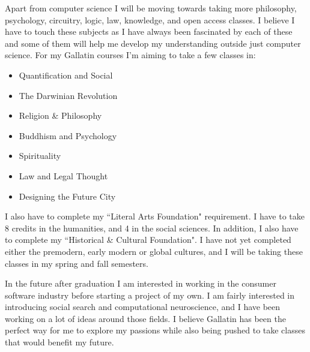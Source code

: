 \documentclass[11pt, oneside]{article}
\begin{document}
\par Apart from computer science I will be moving towards taking more philosophy, psychology, circuitry, logic, law, knowledge, and open access classes. I believe I have to touch these subjects as I have always been fascinated by each of these and some of them will help me develop my understanding outside just computer science. For my Gallatin courses I'm aiming to take a few classes in:

\begin{itemize}
\item Quantification and Social
\item The Darwinian Revolution
\item Religion \& Philosophy
\item Buddhism and Psychology
\item Spirituality
\item Law and Legal Thought
\item Designing the Future City
\end{itemize}

\par I also have to complete my ``Literal Arts Foundation" requirement. I have to take 8 credits in the humanities, and 4 in the social sciences. In addition, I also have to complete my ``Historical \& Cultural Foundation". I have not yet completed either the premodern, early modern or global cultures, and I will be taking these classes in my spring and fall semesters.

\par In the future after graduation I am interested in working in the consumer software industry before starting a project of my own. I am fairly interested in introducing social search and computational neuroscience, and I have been working on a lot of ideas around those fields. I believe Gallatin has been the perfect way for me to explore my passions while also being pushed to take classes that would benefit my future.
\end{document}
